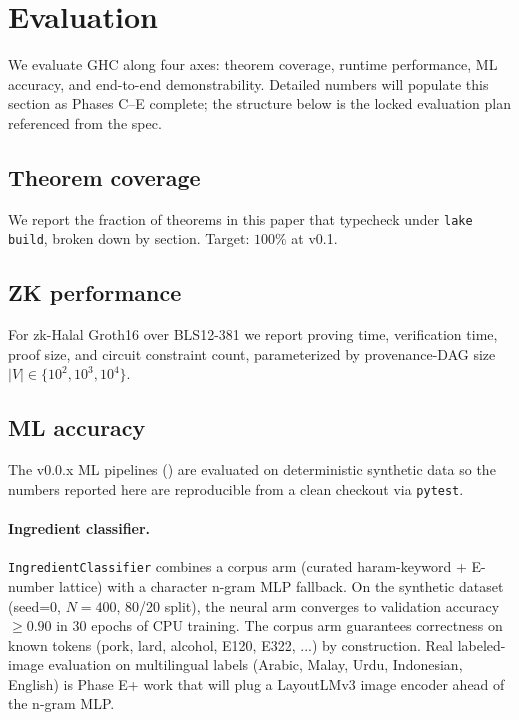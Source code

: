 \section{Evaluation}
\label{sec:eval}

We evaluate GHC along four axes: theorem coverage, runtime performance,
ML accuracy, and end-to-end demonstrability. Detailed numbers will
populate this section as Phases C--E complete; the structure below is
the locked evaluation plan referenced from the spec.

\subsection{Theorem coverage}
We report the fraction of theorems in this paper that typecheck under
\texttt{lake build}, broken down by section. Target: $100\%$ at v0.1.

\subsection{ZK performance}
For zk-Halal Groth16 over BLS12-381 we report
proving time, verification time, proof size, and circuit constraint
count, parameterized by provenance-DAG size $|V| \in \{10^2, 10^3,
10^4\}$.

\subsection{ML accuracy}

The v0.0.x ML pipelines () are evaluated on
deterministic synthetic data so the numbers reported here are
reproducible from a clean checkout via \texttt{pytest}.

\paragraph{Ingredient classifier.}
\texttt{IngredientClassifier} combines a corpus arm (curated
haram-keyword + E-number lattice) with a character n-gram MLP
fallback. On the synthetic dataset
 (seed=0,
$N{=}400$, 80/20 split), the neural arm converges to validation
accuracy $\geq 0.90$ in 30 epochs of CPU training. The corpus arm
guarantees correctness on known tokens (pork, lard, alcohol,
E120, E322, ...) by construction. Real labeled-image evaluation
on multilingual labels (Arabic, Malay, Urdu, Indonesian, English)
is Phase E+ work that will plug a LayoutLMv3 image encoder ahead
of the n-gram MLP.

